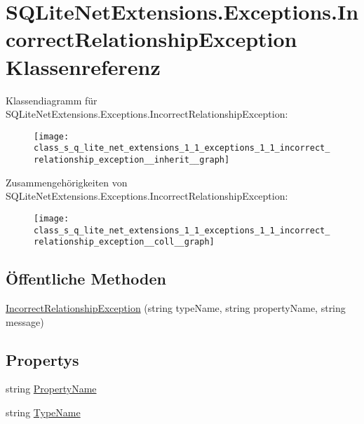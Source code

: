 \hypertarget{class_s_q_lite_net_extensions_1_1_exceptions_1_1_incorrect_relationship_exception}{}\section{S\+Q\+Lite\+Net\+Extensions.\+Exceptions.\+Incorrect\+Relationship\+Exception Klassenreferenz}
\label{class_s_q_lite_net_extensions_1_1_exceptions_1_1_incorrect_relationship_exception}


Klassendiagramm für S\+Q\+Lite\+Net\+Extensions.\+Exceptions.\+Incorrect\+Relationship\+Exception\+:\nopagebreak
\begin{figure}[H]
\begin{center}
\leavevmode
\texttt{[image: class\_s\_q\_lite\_net\_extensions\_1\_1\_exceptions\_1\_1\_incorrect\_relationship\_exception\_\_inherit\_\_graph]}
\end{center}
\end{figure}


Zusammengehörigkeiten von S\+Q\+Lite\+Net\+Extensions.\+Exceptions.\+Incorrect\+Relationship\+Exception\+:\nopagebreak
\begin{figure}[H]
\begin{center}
\leavevmode
\texttt{[image: class\_s\_q\_lite\_net\_extensions\_1\_1\_exceptions\_1\_1\_incorrect\_relationship\_exception\_\_coll\_\_graph]}
\end{center}
\end{figure}
\subsection*{Öffentliche Methoden}
\begin{DoxyCompactItemize}
\item 
\mbox{\hyperlink{class_s_q_lite_net_extensions_1_1_exceptions_1_1_incorrect_relationship_exception_a5e93907be4ced4003bdc411c576646c6}{Incorrect\+Relationship\+Exception}} (string type\+Name, string property\+Name, string message)
\end{DoxyCompactItemize}
\subsection*{Propertys}
\begin{DoxyCompactItemize}
\item 
string \mbox{\hyperlink{class_s_q_lite_net_extensions_1_1_exceptions_1_1_incorrect_relationship_exception_a697bc292eb9b3b10833aaa65dea6b66d}{Property\+Name}}
\item 
string \mbox{\hyperlink{class_s_q_lite_net_extensions_1_1_exceptions_1_1_incorrect_relationship_exception_ae6b9142924bef5a986b740d7be71fdd5}{Type\+Name}}
\end{DoxyCompactItemize}



